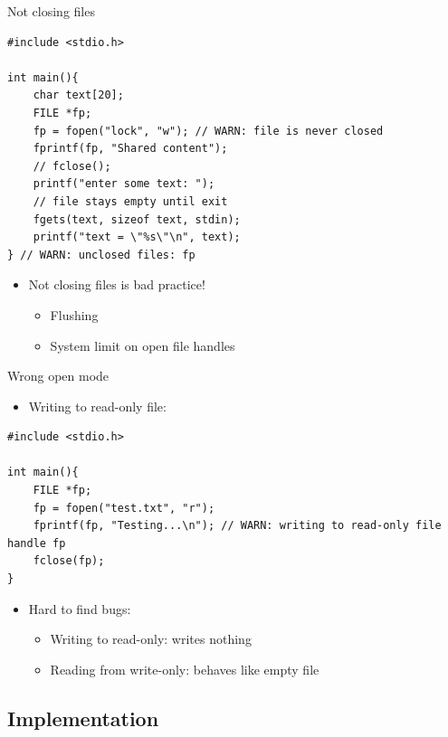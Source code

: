 \documentclass{beamer}
\begin{document}
\begin{frame}[fragile]{Not closing files}
\begin{lstlisting}
#include <stdio.h>

int main(){
    char text[20];
    FILE *fp;
    fp = fopen("lock", "w"); // WARN: file is never closed
    fprintf(fp, "Shared content");
    // fclose();
    printf("enter some text: ");
    // file stays empty until exit
    fgets(text, sizeof text, stdin);
    printf("text = \"%s\"\n", text);
} // WARN: unclosed files: fp
\end{lstlisting}
\begin{itemize}
\item Not closing files is bad practice!
	\begin{itemize}
	\item Flushing
	\item System limit on open file handles
	\end{itemize}
\end{itemize}
\end{frame}

\begin{frame}[fragile]{Wrong open mode}
\begin{itemize}
\item Writing to read-only file:
\end{itemize}
\begin{lstlisting}
#include <stdio.h>

int main(){
    FILE *fp;
    fp = fopen("test.txt", "r"); 
    fprintf(fp, "Testing...\n"); // WARN: writing to read-only file handle fp
    fclose(fp);
}
\end{lstlisting}
\begin{itemize}
\item Hard to find bugs:
	\begin{itemize}
	\item Writing to read-only: writes nothing
	\item Reading from write-only: behaves like empty file
	\end{itemize}
\end{itemize}
\end{frame}

\subsection{Implementation}
\end{document}
